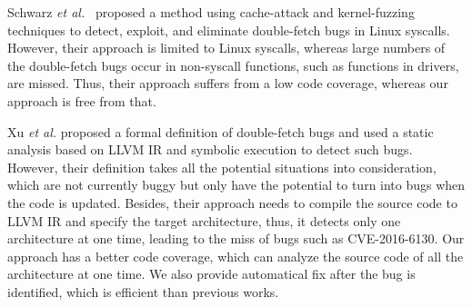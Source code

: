 \documentclass[10pt]{llncs}
\begin{document}
Schwarz \textit{et al.}~\cite{modern} proposed a method using cache-attack and kernel-fuzzing techniques to detect, exploit, and eliminate double-fetch bugs in Linux syscalls. %
However, their approach is limited to Linux syscalls, whereas large numbers of the double-fetch bugs occur in non-syscall functions, such as functions in drivers, are missed. Thus, their approach suffers from a low code coverage, whereas our approach is free from that.%

Xu \textit{et al.}\cite{precise} proposed a formal definition of double-fetch bugs and used a static analysis based on LLVM IR and symbolic execution to detect such bugs. However, their definition takes all the potential situations into consideration, which are not currently buggy but only have the potential to turn into bugs when the code is updated. Besides, their approach needs to compile the source code to LLVM IR and specify the target architecture, thus, it detects only one architecture at one time, leading to the miss of bugs such as CVE-2016-6130. Our approach has a better code coverage, which can analyze the source code of all the architecture at one time. We also provide automatical fix after the bug is identified, which is efficient than previous works.




\end{document}
